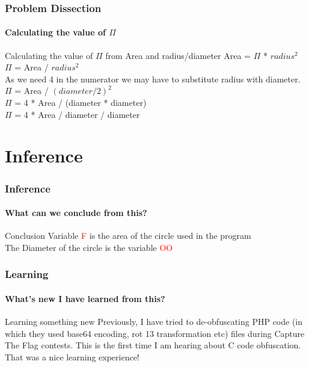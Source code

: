\documentclass[12pt]{beamer}
\begin{document}
\begin{frame}
	\frametitle{Problem Dissection}
	\framesubtitle{Calculating the value of $\Pi$ }
	\begin{block}{Calculating the value of $\Pi$ from Area and radius/diameter}
		Area = $\Pi$ * $radius^{2}$ \\
		$\Pi$ = Area / $radius^{2}$ \\
		As we need 4 in the numerator we may have to substitute radius with diameter.\\
		$\Pi$ = Area / $(diameter/2)^{2}$ \\
		$\Pi$ = 4 * Area / (diameter * diameter) \\
		$\Pi$ = 4 * Area / diameter / diameter \\
	\end{block}
\end{frame}	

\section{Inference}
\begin{frame}
	\frametitle{Inference}
	\framesubtitle{What can we conclude from this?}
	\begin{block}{Conclusion}
		Variable \textcolor{red}{F} is the area of the circle used in the program \\
		The Diameter of the circle is the variable \textcolor{red}{OO}
	\end{block}
\end{frame}

\begin{frame}
	\frametitle{Learning}
	\framesubtitle{What's new I have learned from this?}
	\begin{block}{Learning something new}
		Previously, I have tried to de-obfuscating PHP code (in which they used base64 encoding, rot 13 transformation etc) files during Capture The Flag contests. This is the first time I am hearing about C code obfuscation. That was a nice learning experience!
	\end{block}
\end{frame}

\end{document}
